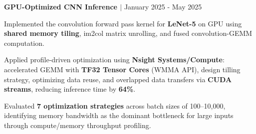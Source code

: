\documentclass[10pt, a4paper]{article}
\newcommand{\resumeItem}[1]{
  \item\small{
    {#1 \vspace{-2pt}}
  }
}
\newcommand{\resumeProjectHeading}[2]{
  \textbf{\small#1} \hfill \small{#2}
  \vspace{2pt}
}
\begin{document}
\resumeProjectHeading
{GPU-Optimized CNN Inference $|$ \normalfont{\small{CUDA, C++}}}{January 2025 - May 2025}
\begin{resumeItemList}
  \resumeItem{Implemented the convolution forward pass kernel for \textbf{LeNet-5} on GPU using \textbf{shared memory tiling}, im2col matrix unrolling, and fused convolution-GEMM computation.}
  \resumeItem{Applied profile-driven optimization using \textbf{Nsight Systems/Compute}: accelerated GEMM with \textbf{TF32 Tensor Cores} (WMMA API), design tilling strategy, optimizing data reuse, and overlapped data transfers via \textbf{CUDA streams}, reducing inference time by \textbf{64\%}.}
  \resumeItem{Evaluated \textbf{7 optimization strategies} across batch sizes of 100--10,000, identifying memory bandwidth as the dominant bottleneck for large inputs through compute/memory throughput profiling.}
\end{resumeItemList}
\end{document}
